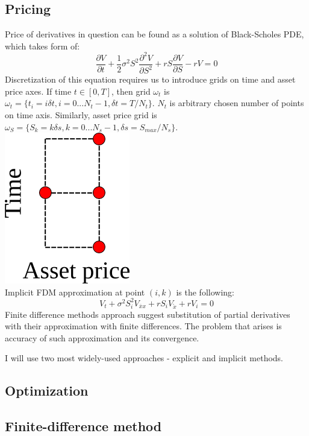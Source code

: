\documentclass[11pt]{article} %
\begin{document}
\subsection{Pricing}
Price of derivatives in question can be found as a solution of Black-Scholes PDE, which  takes form of:
\begin{equation}
\frac{\partial V}{\partial t} + \frac{1}{2}\sigma^2 S^2 \frac{\partial^2 V}{\partial S^2} +rS\frac{\partial V}{\partial S} - rV = 0
\end{equation}
Discretization of this equation requires us to introduce grids on time and asset price axes. If time $t \in [0,T]$, then grid $\omega_t$ is $\omega_t = \lbrace t_i = i\delta t, i = 0...N_t-1, \delta t = T/N_t\rbrace$. $N_t$ is arbitrary chosen number of points on time axis. Similarly, asset price grid is $\omega_S = \lbrace S_k = k\delta s, k = 0...N_s-1, \delta s = S_{max}/N_s\rbrace$.\\
\includegraphics[scale=0.4]{FDM-1.png}\\
Implicit FDM approximation at point $(i,k)$ is the following:
\begin{equation}
V_t + \sigma^2 S_i^2 V_{\overline{x}x} + r S_i V_{\mathring{x}} + rV_i = 0
\end{equation}
Finite difference methods approach suggest substitution of partial derivatives with their approximation with finite differences. The problem that arises is accuracy of such approximation and its convergence.

I will use two most widely-used approaches - explicit and implicit methods. 

\subsection{Optimization}

\subsection{Finite-difference method}
\end{document}
